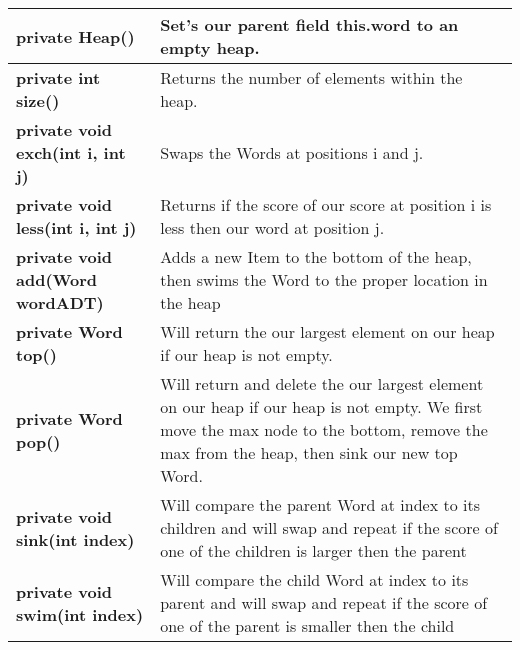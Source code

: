 \documentclass[11pt]{article}
\begin{document}
\begin{tabular}{|p{}|p{}|}
\hline
%
\textbf{private Heap()} & Set's our parent field this.word to an empty heap.\\
%
\hline
\textbf{private int size()} & Returns the number of elements within the heap.\\
%
\hline 
\textbf{private void exch(int i, int j)} & Swaps the Words at positions i and j.\\
%
\hline
\textbf{private void less(int i, int j)} & Returns if the score of our score at position i is less then our word at position j.\\
%
\hline
\textbf{private void add(Word wordADT)} & Adds a new Item to the bottom of the heap, then swims the Word to the proper location in the heap\\
%
\hline
\textbf{private Word top()} & Will return the our largest element on our heap if our heap is not empty.\\
%
\hline
\textbf{private Word pop()} & Will return and delete the our largest element on our heap if our heap is not empty. We first move the max node to the bottom, remove the max from the heap, then sink our new top Word.\\
%
\hline
\textbf{private void sink(int index)} & Will compare the parent Word at index to its children and will swap and repeat if the score of one of the children is larger then the parent\\
%
\hline
\textbf{private void swim(int index)} & Will compare the child Word at index to its parent and will swap and repeat if the score of one of the parent is smaller then the child\\
\hline
\end{tabular}

\newpage
\end{document}
